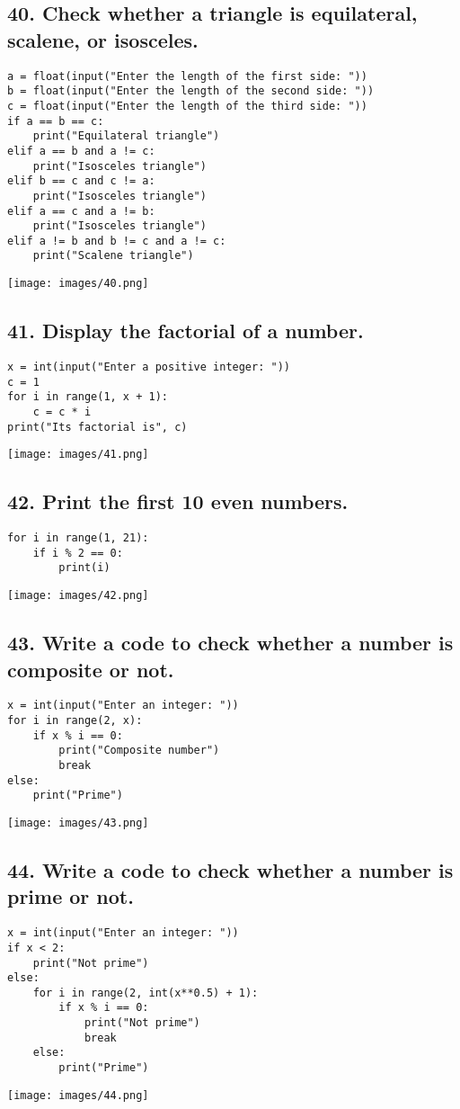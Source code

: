 \documentclass[12pt]{article}
\begin{document}
\subsection*{40. Check whether a triangle is equilateral, scalene, or isosceles.}
\begin{verbatim}
a = float(input("Enter the length of the first side: "))
b = float(input("Enter the length of the second side: "))
c = float(input("Enter the length of the third side: "))
if a == b == c:
    print("Equilateral triangle")
elif a == b and a != c:
    print("Isosceles triangle")
elif b == c and c != a:
    print("Isosceles triangle")
elif a == c and a != b:
    print("Isosceles triangle")
elif a != b and b != c and a != c:
    print("Scalene triangle")
\end{verbatim}
\texttt{[image: images/40.png]}

\subsection*{41. Display the factorial of a number.}
\begin{verbatim}
x = int(input("Enter a positive integer: "))
c = 1
for i in range(1, x + 1):
    c = c * i
print("Its factorial is", c)
\end{verbatim}
\texttt{[image: images/41.png]}

\subsection*{42. Print the first 10 even numbers.}
\begin{verbatim}
for i in range(1, 21):
    if i % 2 == 0:
        print(i)
\end{verbatim}
\texttt{[image: images/42.png]}

\subsection*{43. Write a code to check whether a number is composite or not.}
\begin{verbatim}
x = int(input("Enter an integer: "))
for i in range(2, x):
    if x % i == 0:
        print("Composite number")
        break
else:
    print("Prime")
\end{verbatim}
\texttt{[image: images/43.png]}

\subsection*{44. Write a code to check whether a number is prime or not.}
\begin{verbatim}
x = int(input("Enter an integer: "))
if x < 2:
    print("Not prime")
else:
    for i in range(2, int(x**0.5) + 1):
        if x % i == 0:
            print("Not prime")
            break
    else:
        print("Prime")    
\end{verbatim}
\texttt{[image: images/44.png]}
\end{document}
